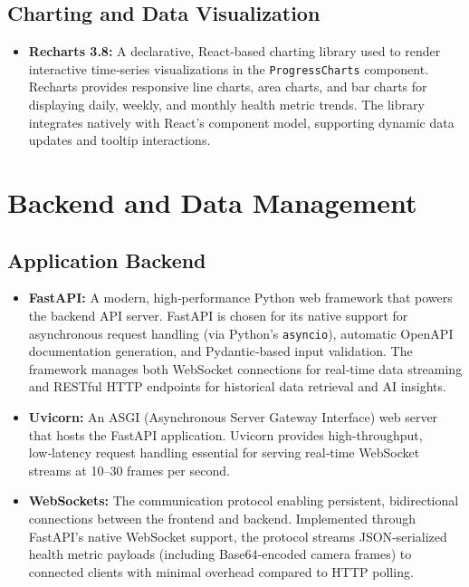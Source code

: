 \documentclass[12pt]{report}
\begin{document}
\subsection{Charting and Data Visualization}

\begin{itemize}
    \item \textbf{Recharts 3.8:} A declarative, React‑based charting library used to render interactive time‑series visualizations in the \texttt{ProgressCharts} component. Recharts provides responsive line charts, area charts, and bar charts for displaying daily, weekly, and monthly health metric trends. The library integrates natively with React's component model, supporting dynamic data updates and tooltip interactions.
\end{itemize}

\section{Backend and Data Management}

\subsection{Application Backend}

\begin{itemize}
    \item \textbf{FastAPI:} A modern, high‑performance Python web framework that powers the backend API server. FastAPI is chosen for its native support for asynchronous request handling (via Python's \texttt{asyncio}), automatic OpenAPI documentation generation, and Pydantic‑based input validation. The framework manages both WebSocket connections for real‑time data streaming and RESTful HTTP endpoints for historical data retrieval and AI insights.
    \item \textbf{Uvicorn:} An ASGI (Asynchronous Server Gateway Interface) web server that hosts the FastAPI application. Uvicorn provides high‑throughput, low‑latency request handling essential for serving real‑time WebSocket streams at 10–30 frames per second.
    \item \textbf{WebSockets:} The communication protocol enabling persistent, bidirectional connections between the frontend and backend. Implemented through FastAPI's native WebSocket support, the protocol streams JSON‑serialized health metric payloads (including Base64‑encoded camera frames) to connected clients with minimal overhead compared to HTTP polling.
\end{itemize}
\end{document}
